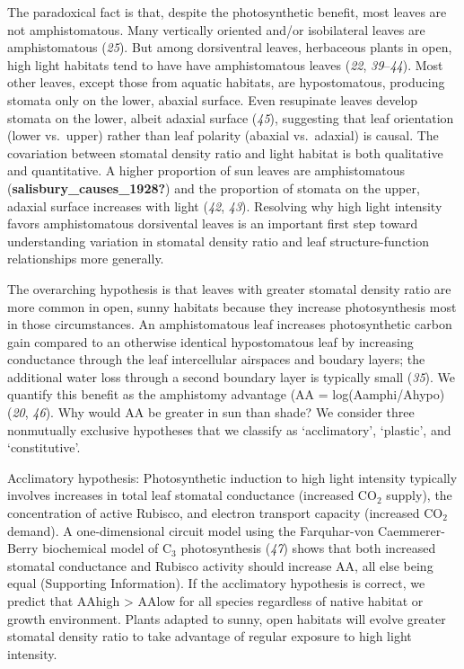 \documentclass[
  letterpaper,
  DIV=11,
  numbers=noendperiod]{scrartcl}
\begin{document}
The paradoxical fact is that, despite the photosynthetic benefit, most
leaves are not amphistomatous. Many vertically oriented and/or
isobilateral leaves are amphistomatous (\emph{25}). But among
dorsiventral leaves, herbaceous plants in open, high light habitats tend
to have have amphistomatous leaves (\emph{22}, \emph{39}--\emph{44}).
Most other leaves, except those from aquatic habitats, are
hypostomatous, producing stomata only on the lower, abaxial surface.
Even resupinate leaves develop stomata on the lower, albeit adaxial
surface (\emph{45}), suggesting that leaf orientation (lower vs.~upper)
rather than leaf polarity (abaxial vs.~adaxial) is causal. The
covariation between stomatal density ratio and light habitat is both
qualitative and quantitative. A higher proportion of sun leaves are
amphistomatous (\textbf{salisbury\_causes\_1928?}) and the proportion of
stomata on the upper, adaxial surface increases with light (\emph{42},
\emph{43}). Resolving why high light intensity favors amphistomatous
dorsivental leaves is an important first step toward understanding
variation in stomatal density ratio and leaf structure-function
relationships more generally.

The overarching hypothesis is that leaves with greater stomatal density
ratio are more common in open, sunny habitats because they increase
photosynthesis most in those circumstances. An amphistomatous leaf
increases photosynthetic carbon gain compared to an otherwise identical
hypostomatous leaf by increasing conductance through the leaf
intercellular airspaces and boudary layers; the additional water loss
through a second boundary layer is typically small (\emph{35}). We
quantify this benefit as the amphistomy advantage (AA =
log(Aamphi/Ahypo) (\emph{20}, \emph{46}). Why would AA be greater in sun
than shade? We consider three nonmutually exclusive hypotheses that we
classify as `acclimatory', `plastic', and `constitutive'.

Acclimatory hypothesis: Photosynthetic induction to high light intensity
typically involves increases in total leaf stomatal conductance
(increased CO\(_2\) supply), the concentration of active Rubisco, and
electron transport capacity (increased CO\(_2\) demand). A
one-dimensional circuit model using the Farquhar-von Caemmerer-Berry
biochemical model of C\(_3\) photosynthesis (\emph{47}) shows that both
increased stomatal conductance and Rubisco activity should increase AA,
all else being equal (Supporting Information). If the acclimatory
hypothesis is correct, we predict that AAhigh \textgreater{} AAlow for
all species regardless of native habitat or growth environment. Plants
adapted to sunny, open habitats will evolve greater stomatal density
ratio to take advantage of regular exposure to high light intensity.
\end{document}

